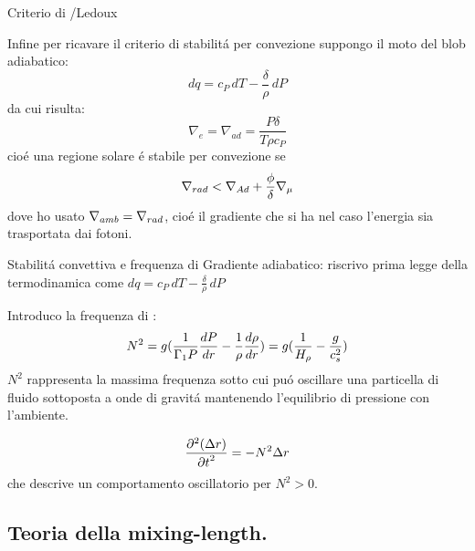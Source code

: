 \begin{wordonframe}{Criterio di \sch/Ledoux}

Infine per ricavare il criterio di stabilit\'a per convezione suppongo  il moto del blob adiabatico:
\begin{equation*}
dq=c_P\,dT-\frac{\delta}{\rho}\,dP
\end{equation*}
da cui risulta:
\begin{equation*}
\nabla_e=\nabla_{ad}=\frac{P\delta}{T\rho c_P}
\end{equation*}
cio\'e una regione solare \'e stabile per convezione se
\begin{equation*}
\nrad{}<\nad+\frac{\phi}{\delta}\nmu{}\label{eq:ledoux}
\end{equation*}
dove ho usato $\nabla_{amb}=\nrad{}$, cio\'e il gradiente che si ha nel caso l'energia sia trasportata dai fotoni.
\end{wordonframe}

\begin{wordonframe}{Stabilit\'a convettiva e frequenza di \bv{}}
Gradiente adiabatico: riscrivo prima legge della termodinamica come $dq=c_P\,dT-\frac{\delta}{\rho}\,dP$

Introduco la frequenza di \bv{}:
\begin{equation*}
N^2=g(\frac{1}{\Gamma_1P}\TDy{r}{P}-\frac{1}{\rho}\TDy{r}{\rho})=g(\frac{1}{\densityscale{}}-\frac{g}{c_s^2})\label{eq:bvfs}
\end{equation*}
$N^2$ rappresenta la massima frequenza sotto cui pu\'o oscillare una particella di fluido sottoposta a onde di gravit\'a mantenendo l'equilibrio di pressione con l'ambiente.

\begin{equation*}
\PtwoDy{t}{(\Delta r)}=-N^2\Delta r
\end{equation*}
che descrive un comportamento oscillatorio per $N^2>0$.

\end{wordonframe}

\subsection{Teoria della mixing-length.}

